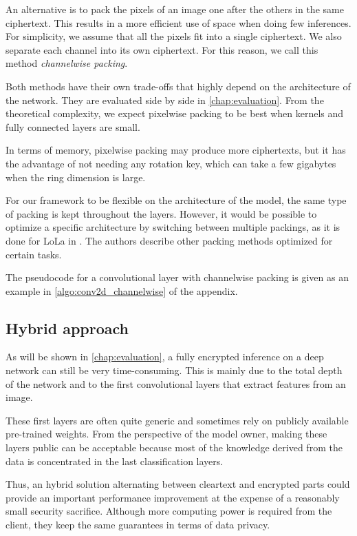 \documentclass[a4paper,11pt,oneside]{report}
\begin{document}
An alternative is to pack the pixels of an image one after the others in the same ciphertext. 
This results in a more efficient use of space when doing few inferences. For simplicity, we assume that all the pixels fit into a single ciphertext. 
We also separate each channel into its own ciphertext. 
For this reason, we call this method \emph{channelwise packing}.

Both methods have their own trade-offs that highly depend on the architecture of the network. 
They are evaluated side by side in \autoref{chap:evaluation}. 
From the theoretical complexity, we expect pixelwise packing to be best when kernels and fully connected layers are small.


In terms of memory, pixelwise packing may produce more ciphertexts, but it has the advantage of not needing any rotation key, which can take a few gigabytes when the ring dimension is large.

For our framework to be flexible on the architecture of the model, the same type of packing is kept throughout the layers. 
However, it would be possible to optimize a specific architecture by switching between multiple packings, as it is done for LoLa in \cite{brutzkus_low_2019}. 
The authors describe other packing methods optimized for certain tasks.

The pseudocode for a convolutional layer with channelwise packing is given as an example in \autoref{algo:conv2d_channelwise} of the appendix.

\subsection{Hybrid approach}\label{sec:hybrid_cnn}

As will be shown in \autoref{chap:evaluation}, a fully encrypted inference on a deep network can still be very time-consuming.
This is mainly due to the total depth of the network and to the first convolutional layers that extract features from an image.

These first layers are often quite generic and sometimes rely on publicly available pre-trained weights.
From the perspective of the model owner, making these layers public can be acceptable because most of the knowledge derived from the data is concentrated in the last classification layers.

Thus, an hybrid solution alternating between cleartext and encrypted parts could provide an important performance improvement at the expense of a reasonably small security sacrifice.
Although more computing power is required from the client, they keep the same guarantees in terms of data privacy.
\end{document}
